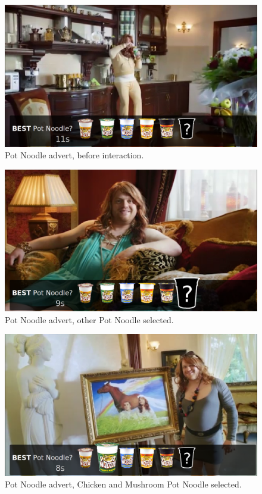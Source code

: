 	\begin{figure}[th]
		\centering
		\includegraphics[width=\textwidth,height=0.5\textheight,keepaspectratio]{images/adverts/pot_noodle-1.png}
		\caption{Pot Noodle advert, before interaction.}
		\label{fig:potNoodle1}
	\end{figure}
	
	\begin{figure}[th]
		\centering
		\includegraphics[width=\textwidth,height=0.5\textheight,keepaspectratio]{images/adverts/pot_noodle-2.png}
		\caption{Pot Noodle advert, other Pot Noodle selected.}
		\label{fig:potNoodle2}
	\end{figure}
	
	\begin{figure}[th]
		\centering
		\includegraphics[width=\textwidth,height=0.5\textheight,keepaspectratio]{images/adverts/pot_noodle-3.png}
		\caption{Pot Noodle advert, Chicken and Mushroom Pot Noodle selected.}
		\label{fig:potNoodle3}
	\end{figure}
	
